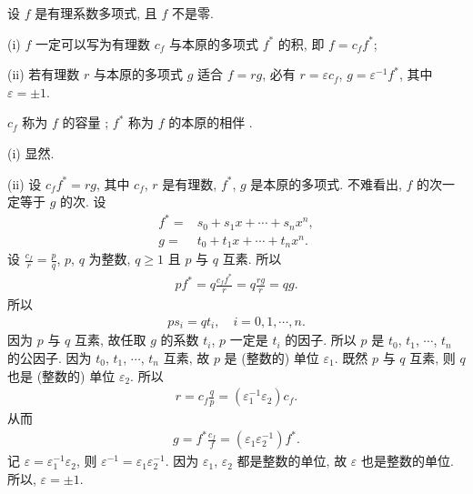 \begin{proposition}
    设 $f$ 是有理系数多项式, 且 $f$ 不是零.

    (i) $f$ 一定可以写为有理数 $c_f$ 与本原的多项式 $f^{\ast}$ 的积, 即 $f = c_f f^{\ast}$;

    (ii) 若有理数 $r$ 与本原的多项式 $g$ 适合 $f = rg$, 必有 $r = \varepsilon c_f$, $g = \varepsilon^{-1} f^{\ast}$, 其中 $\varepsilon = \pm 1$.

    $c_f$ 称为 $f$ 的容量 ; $f^{\ast}$ 称为 $f$ 的本原的相伴 .
\end{proposition}

\begin{pf}
    (i) 显然.

    (ii) 设 $c_f f^{\ast} = r g$, 其中 $c_f$, $r$ 是有理数, $f^{\ast}$, $g$ 是本原的多项式. 不难看出, $f$ 的次一定等于 $g$ 的次. 设
    \begin{align*}
        f^{\ast} = {} & s_0 + s_1 x + \cdots + s_n x^n, \\
        g = {}        & t_0 + t_1 x + \cdots + t_n x^n.
    \end{align*}
    设 $\frac{c_f}{r} = \frac{p}{q}$, $p$, $q$ 为整数, $q \geq 1$ 且 $p$ 与 $q$ 互素. 所以
    \begin{align*}
        p f^{\ast} = q \frac{c_f f^{\ast}}{r} = q \frac{r g}{r} = q g.
    \end{align*}
    所以
    \begin{align*}
        p s_i = q t_i, \quad i = 0,1,\cdots,n.
    \end{align*}
    因为 $p$ 与 $q$ 互素, 故任取 $g$ 的系数 $t_i$, $p$ 一定是 $t_i$ 的因子. 所以 $p$ 是 $t_0$, $t_1$, $\cdots$, $t_n$ 的公因子. 因为 $t_0$, $t_1$, $\cdots$, $t_n$ 互素, 故 $p$ 是 (整数的) 单位 $\varepsilon_1$. 既然 $p$ 与 $q$ 互素, 则 $q$ 也是 (整数的) 单位 $\varepsilon_2$. 所以
    \begin{align*}
        r = c_f \frac{q}{p} = (\varepsilon_1^{-1} \varepsilon_2) c_f.
    \end{align*}
    从而
    \begin{align*}
        g = f^{\ast} \frac{c_f}{f} = (\varepsilon_1 \varepsilon_2^{-1}) f^{\ast}.
    \end{align*}
    记 $\varepsilon = \varepsilon_1^{-1} \varepsilon_2$, 则 $\varepsilon^{-1} = \varepsilon_1 \varepsilon_2^{-1}$. 因为 $\varepsilon_1$, $\varepsilon_2$ 都是整数的单位, 故 $\varepsilon$ 也是整数的单位. 所以, $\varepsilon = \pm 1$.
\end{pf}

